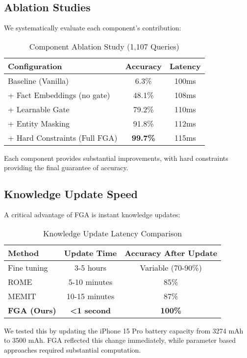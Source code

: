 \documentclass[11pt, a4paper]{article}
\theoremstyle{definition}
\begin{document}
\subsection{Ablation Studies}

We systematically evaluate each component's contribution:

\begin{table}[h]
\centering
\caption{Component Ablation Study (1,107 Queries)}
\begin{tabular}{lcc}
\toprule
\textbf{Configuration} & \textbf{Accuracy} & \textbf{Latency} \\
\midrule
Baseline (Vanilla) & 6.3\% & 100ms \\
+ Fact Embeddings (no gate) & 48.1\% & 108ms \\
+ Learnable Gate & 79.2\% & 110ms \\
+ Entity Masking & 91.8\% & 112ms \\
+ Hard Constraints (Full FGA) & \textbf{99.7\%} & 115ms \\
\bottomrule
\end{tabular}
\end{table}

Each component provides substantial improvements, with hard constraints providing the final guarantee of accuracy.

\subsection{Knowledge Update Speed}

A critical advantage of FGA is instant knowledge updates:

\begin{table}[h]
\centering
\caption{Knowledge Update Latency Comparison}
\begin{tabular}{lcc}
\toprule
\textbf{Method} & \textbf{Update Time} & \textbf{Accuracy After Update} \\
\midrule
Fine tuning & 3-5 hours & Variable (70-90\%) \\
ROME \cite{meng2022locating} & 5-10 minutes & 85\% \\
MEMIT \cite{meng2023memit} & 10-15 minutes & 87\% \\
\textbf{FGA (Ours)} & \textbf{<1 second} & \textbf{100\%} \\
\bottomrule
\end{tabular}
\end{table}

We tested this by updating the iPhone 15 Pro battery capacity from 3274 mAh to 3500 mAh. FGA reflected this change immediately, while parameter based approaches required substantial computation.
\end{document}
